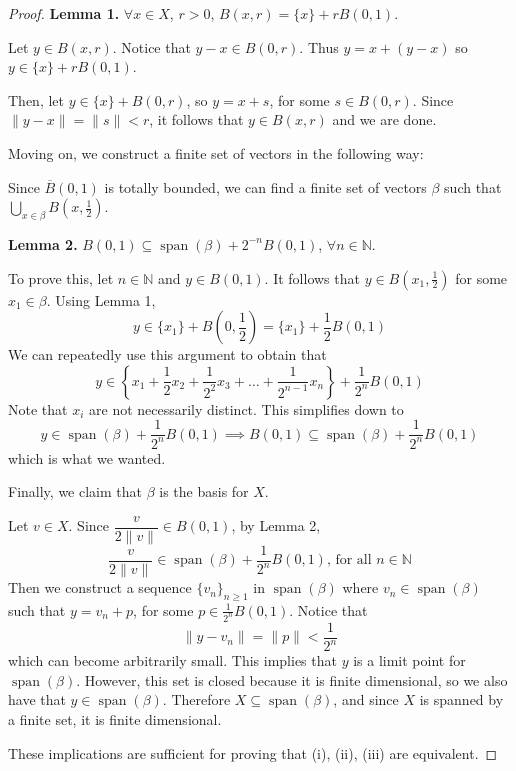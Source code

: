 \documentclass{article}
\newcommand{\cl}[1]{\overline{#1}}
\theoremstyle{plain} %
\numberwithin{thm}{section} %
\theoremstyle{definition}
\begin{document}
\begin{proof}
            \textbf{Lemma 1.} \(\forall x \in X\), \(r > 0\), \(B(x,r) = \{x\} + rB(0,1)\).

            Let \(y \in B(x,r)\). Notice that \(y-x \in B(0,r)\). Thus \(y = x + (y-x)\) so \(y \in \{x\} + rB(0,1)\).

            Then, let \(y \in \{x\} + B(0,r)\), so \(y = x + s\), for some \(s \in B(0,r)\). Since \(\|y-x\| = \|s\| < r\), it follows that \(y \in B(x,r)\) and we are done.
            
            Moving on, we construct a finite set of vectors in the following way:

            Since \(\cl{B}(0,1)\) is totally bounded, we can find a finite set of vectors \(\beta\) such that \(\bigcup_{x \in \beta} B\left(x,\frac{1}{2}\right)\).

            \textbf{Lemma 2.} \(B(0,1) \subseteq \operatorname{span}(\beta) + 2^{-n} B(0,1)\), \(\forall n \in \mathbb{N}\).

            To prove this, let \(n \in \mathbb{N}\) and \(y \in B(0,1)\). It follows that \(y \in B(x_1, \frac{1}{2})\) for some \(x_1 \in \beta\). Using Lemma 1,
            \[
                y \in \{x_1\} + B\left(0,\frac{1}{2}\right) = \{x_1\} + \frac{1}{2}B(0,1)
            \]
            We can repeatedly use this argument to obtain that
            \[
                y \in \left\{x_1 + \frac{1}{2}x_2 + \frac{1}{2^2}x_3 + \dots + \frac{1}{2^{n-1}}x_n\right\} + \frac{1}{2^n}B(0,1)
            \]
            Note that \(x_i\) are not necessarily distinct. This simplifies down to
            \[
                y \in \operatorname{span}(\beta) + \frac{1}{2^n}B(0,1) \implies B(0,1) \subseteq \operatorname{span}(\beta) + \frac{1}{2^n}B(0,1)
            \]
            which is what we wanted.

            Finally, we claim that \(\beta\) is the basis for \(X\).

            Let \(v \in X\). Since \(\dfrac{v}{2\|v\|} \in B(0,1)\), by Lemma 2,
            \[
                \frac{v}{2\|v\|} \in \operatorname{span}(\beta) + \frac{1}{2^n}B(0,1) \text{, for all } n \in \mathbb{N}
            \]
            Then we construct a sequence \(\{v_n\}_{n\geq 1}\) in \(\operatorname{span}(\beta)\) where \(v_n \in \operatorname{span}(\beta)\) such that \(y = v_n + p\), for some \(p \in \frac{1}{2^n}B(0,1)\). Notice that
            \[
                \|y - v_n\| = \|p\| < \frac{1}{2^n}
            \]
            which can become arbitrarily small. This implies that \(y\) is a limit point for \(\operatorname{span}(\beta)\). However, this set is closed because it is finite dimensional, so we also have that \(y \in \operatorname{span}(\beta)\). Therefore \(X \subseteq \operatorname{span}(\beta)\), and since \(X\) is spanned by a finite set, it is finite dimensional.

            These implications are sufficient for proving that (i), (ii), (iii) are equivalent.
        \end{proof}
\end{document}
